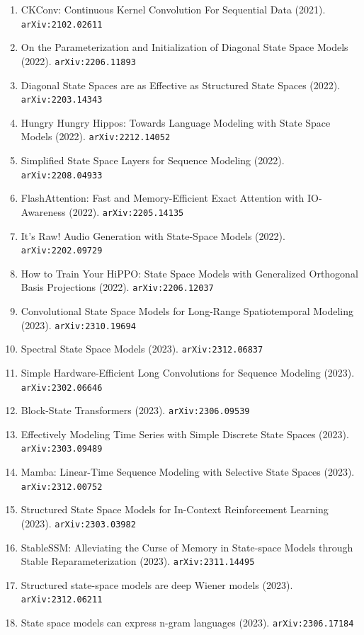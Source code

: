 \documentclass[11pt]{article}
\begin{document}
\begin{enumerate}
  Linear State-Space Layers (2021). \texttt{arXiv:2110.13985}
  \item CKConv: Continuous Kernel Convolution For Sequential Data (2021). \texttt{arXiv:2102.02611}
  \item On the Parameterization and Initialization of Diagonal State Space
  Models (2022). \texttt{arXiv:2206.11893}
  \item Diagonal State Spaces are as Effective as Structured State Spaces (2022). \texttt{arXiv:2203.14343}
  \item Hungry Hungry Hippos: Towards Language Modeling with State Space Models (2022). \texttt{arXiv:2212.14052}
  \item Simplified State Space Layers for Sequence Modeling (2022). \texttt{arXiv:2208.04933}
  \item FlashAttention: Fast and Memory-Efficient Exact Attention with
  IO-Awareness (2022). \texttt{arXiv:2205.14135}
  \item It's Raw! Audio Generation with State-Space Models (2022). \texttt{arXiv:2202.09729}
  \item How to Train Your HiPPO: State Space Models with Generalized Orthogonal
  Basis Projections (2022). \texttt{arXiv:2206.12037}
  \item Convolutional State Space Models for Long-Range Spatiotemporal Modeling (2023). \texttt{arXiv:2310.19694}
  \item Spectral State Space Models (2023). \texttt{arXiv:2312.06837}
  \item Simple Hardware-Efficient Long Convolutions for Sequence Modeling (2023). \texttt{arXiv:2302.06646}
  \item Block-State Transformers (2023). \texttt{arXiv:2306.09539}
  \item Effectively Modeling Time Series with Simple Discrete State Spaces (2023). \texttt{arXiv:2303.09489}
  \item Mamba: Linear-Time Sequence Modeling with Selective State Spaces (2023). \texttt{arXiv:2312.00752}
  \item Structured State Space Models for In-Context Reinforcement Learning (2023). \texttt{arXiv:2303.03982}
  \item StableSSM: Alleviating the Curse of Memory in State-space Models through
  Stable Reparameterization (2023). \texttt{arXiv:2311.14495}
  \item Structured state-space models are deep Wiener models (2023). \texttt{arXiv:2312.06211}
  \item State space models can express n-gram languages (2023). \texttt{arXiv:2306.17184}

\end{enumerate}
\end{document}
